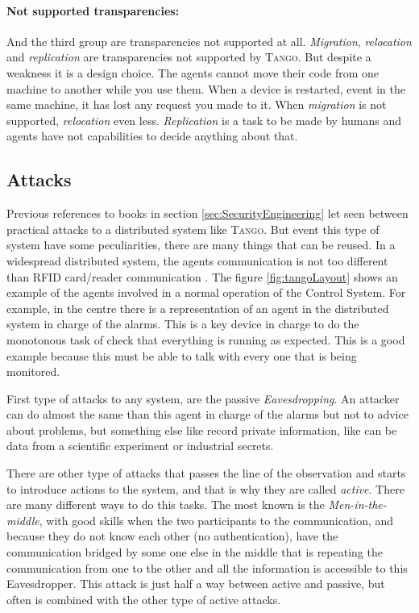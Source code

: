 \documentclass[10pt,a4paper,twoside]{llncs}
\newcommand{\tango}{\textsc{Tango}}
\begin{document}
\paragraph{Not supported transparencies:} And the third group are transparencies not supported at all. \emph{Migration}, \emph{relocation} and \emph{replication} are transparencies not supported by \tango. But despite a weakness it is a design choice. The agents cannot move their code from one machine to another while you use them. When a device is restarted, event in the same machine, it has lost any request you made to it. When \emph{migration} is not supported, \emph{relocation} even less. \emph{Replication} is a task to be made by humans and agents have not capabilities to decide anything about that.

\subsection{Attacks}

Previous references to books in section \ref{sec:SecurityEngineering} let seen between practical attacks to a distributed system like \tango. But event this type of system have some peculiarities, there are many things that can be reused. In a widespread distributed system, the agents communication is not too different than RFID card/reader communication \cite{Santi11}. The figure \ref{fig:tangoLayout} shows an example of the agents involved in a normal operation of the Control System. For example, in the centre there is a representation of an agent in the distributed system in charge of the alarms. This is a key device in charge to do the monotonous task of check that everything is running as expected. This is a good example because this must be able to talk with every one that is being monitored.

First type of attacks to any system, are the passive \emph{Eavesdropping}. An attacker can do almost the same than this agent in charge of the alarms but not to advice about problems, but something else like record private information, like can be data from a scientific experiment or industrial secrets.

There are other type of attacks that passes the line of the observation and starts to introduce actions to the system, and that is why they are called \emph{active}. There are many different ways to do this tasks. The most known is the \emph{Men-in-the-middle}, with good skills when the two participants to the communication, and because they do not know each other (no authentication), have the communication bridged by some one else in the middle that is repeating the communication from one to the other and all the information is accessible to this Eavesdropper. This attack is just half a way between active and passive, but often is combined with the other type of active attacks.
\end{document}
